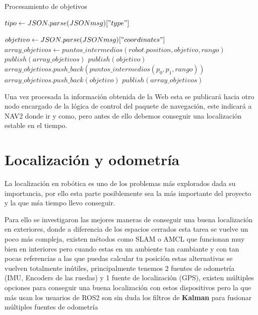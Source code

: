 \begin{algorithm}[H]
  \caption{Procesamiento de objetivos}\label{objetivos}
  \begin{algorithmic}[1]
     
        \State $tipo\gets JSON.parse(JSONmsg)["type"]$
       
            \State $objetivo\gets JSON.parse(JSONmsg)["coordinates"]$
                \State $array\_objetivos \gets puntos\_intermedios(robot.position, objetivo, rango)$ 
                \State $publish(array\_objetivos)$
             \Else
                \State $publish(objetivo)$
             \EndIf
        \Else
             
                \State $array\_objetivos.push\_back( puntos\_intermedios(p_0, p_1, rango))$
             \Else
                \State $array\_objetivos.push\_back(objetivo)$
             \EndIf
            \EndFor
            \State $publish(array\_objetivos)$
        \EndIf
    \EndProcedure
  \end{algorithmic}
\end{algorithm}

Una vez procesada la información obtenida de la Web esta se publicará hacia otro nodo encargado de la lógica de control del paquete de 
navegación, este indicará a NAV2 donde ir y como, pero antes de ello debemos conseguir una localización estable en el tiempo.

\section{Localización y odometría}

La localización en robótica es uno de los problemas más explorados dada su importancia, por ello esta parte posiblemente sea la más 
importante del proyecto y la que mśa tiempo llevo conseguir.

Para ello se investigaron las mejores maneras de conseguir una buena localización en exteriores, donde a diferencia de los espacios cerrados 
esta tarea se vuelve un poco más compleja, existen métodos como SLAM o AMCL que funcionan muy bien en interiores pero cuando estas en un 
ambiente tan cambiante y con tan pocas referencias a las que puedas calcular tu posición estas alternativas se vuelven totalmente 
inútiles, principalmente tenemos 2 fuentes de odometría (IMU, Encoders de las ruedas) y 1 fuente de localización (GPS), existen múltiples 
opciones para conseguir una buena localización con estos dispositivos 
pero la que más usan los usuarios de ROS2 son sin duda los filtros de \textbf{Kalman} para fusionar múltiples fuentes de odometría 
 
